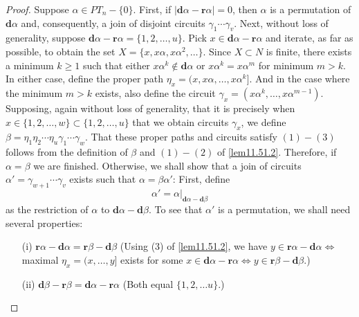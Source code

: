 \documentclass{surv-l}
\numberwithin{equation}{section}
\numberwithin{table}{section}
\numberwithin{figure}{section}
\theoremstyle{plain}
\theoremstyle{definition}
\begin{document}
\begin{proof}Suppose $\alpha\in PT_{n}-\{0\}$. First, if
$|\mathbf{d}\alpha-\mathbf{r}\alpha|=0$, then $\alpha$ is a
permutation of $\mathbf{d}\alpha$ and, consequently, a join of
disjoint circuits $\gamma_{1}\cdots\gamma_{v}$. Next, without loss
of generality, suppose
$\mathbf{d}\alpha-\mathbf{r}\alpha=\{1,2,\ldots, u\}$. Pick $ x\in
\mathbf{d}\alpha-\mathbf{r}\alpha$ and iterate, as far as
possible, to obtain the set $X=\{x, x\alpha,x\alpha^{2},
\ldots\}$. Since $X\subset N$ is finite, there exists a minimum
$k\geq 1$ such that either $ x\alpha^{k}\not\in \mathbf{d}\alpha$
or $x\alpha^{k}=x\alpha^{m}$ for minimum $m>k$. In either case,
define the proper path $\eta_{x}=(x,  x\alpha,\ldots,
x\alpha^{k}]$. And in the case where the minimum $m>k$ exists,
also define the circuit $\gamma_{x}= (x\alpha^{k},\ldots,
x\alpha^{m-1})$. Supposing, again without loss of generality, that
it is precisely when $x\in\{1,2,\ldots, w\}\subset\{1,2,\ldots,
u\}$ that we obtain circuits $\gamma_{x}$, we define
$\beta=\eta_{1}\eta_{2}\cdots\eta_{u}\gamma_{1}\cdots\gamma_{w}$.
That these proper paths and circuits satisfy $(1)-(3)$ follows
from the definition of $\beta$ and $(1)-(2)$ of \ref{lem11.51.2}.
Therefore, if $\alpha=\beta$ we are finished. Otherwise, we shall
show that a join of circuits
$\alpha'=\gamma_{w+1}\cdots\gamma_{v}$ exists such that
$\alpha=\beta\alpha'$: First, define
\[
\alpha'=\alpha|_{\mathbf{d}\alpha-\mathbf{d}\beta}
\]
as the restriction of $\alpha$ to
$\mathbf{d}\alpha-\mathbf{d}\beta$. To see that $\alpha'$ is a
permutation, we shall need several properties:
\begin{enumerate}
\item[(i)] $\mathbf{r}\alpha-\mathbf{d}\alpha=\mathbf{r}\beta-\mathbf{d}\beta$\quad
(Using (3) of \ref{lem11.51.2}, we have $y\in
\mathbf{r}\alpha-\mathbf{d}\alpha\Leftrightarrow$ maximal
$\eta_{x}=(x,\ldots, y]$ exists for some $x\in
\mathbf{d}\alpha-\mathbf{r}\alpha\Leftrightarrow y\in
\mathbf{r}\beta-\mathbf{d}\beta.$)

\item[(ii)] $\mathbf{d}\beta-\mathbf{r}\beta=\mathbf{d}\alpha-\mathbf{r}\alpha$\quad
(Both equal $\{1, 2, \ldots u\}.$)


\end{enumerate}
\end{proof}
\end{document}
